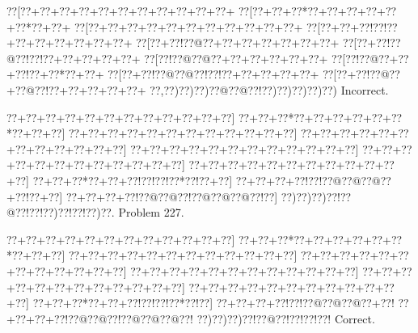 \documentclass[a5paper]{article}
\begin{document}
\begin{center}
{\goo
\0??[\0??+\0??+\0??+\0??+\0??+\0??+\0??+\0??+\0??+\0??+\0??+
\0??[\0??+\0??+\0??*\0??+\0??+\0??+\0??+\0??+\0??*\0??+\0??+
\0??[\0??+\0??+\0??+\0??+\0??+\0??+\0??+\0??+\0??+\0??+\0??+
\0??[\0??+\0??+\0??!\0??!\0??+\0??+\0??+\0??+\0??+\0??+\0??+
\0??[\0??+\0??!\0??@\0??+\0??+\0??+\0??+\0??+\0??+\0??+
\0??[\0??+\0??!\0??@\0??!\0??!\0??+\0??+\0??+\0??+\0??+
\0??[\0??!\0??@\0??@\0??+\0??+\0??+\0??+\0??+\0??+
\0??[\0??!\0??@\0??+\0??+\0??!\0??+\0??*\0??+\0??+
\0??[\0??+\0??!\0??@\0??@\0??!\0??!\0??+\0??+\0??+\0??+\0??+
\0??[\0??+\0??!\0??@\0??+\0??@\0??!\0??+\0??+\0??+\0??+\0??+
\0??,\0??)\0??)\0??)\0??@\0??@\0??!\0??)\0??)\0??)\0??)\0??)
}
Incorrect. 

\end{center}
\newpage
\begin{center}
{\goo
\0??+\0??+\0??+\0??+\0??+\0??+\0??+\0??+\0??+\0??+\0??+\0??]
\0??+\0??+\0??*\0??+\0??+\0??+\0??+\0??+\0??*\0??+\0??+\0??]
\0??+\0??+\0??+\0??+\0??+\0??+\0??+\0??+\0??+\0??+\0??+\0??]
\0??+\0??+\0??+\0??+\0??+\0??+\0??+\0??+\0??+\0??+\0??+\0??]
\0??+\0??+\0??+\0??+\0??+\0??+\0??+\0??+\0??+\0??+\0??+\0??]
\0??+\0??+\0??+\0??+\0??+\0??+\0??+\0??+\0??+\0??+\0??+\0??]
\0??+\0??+\0??+\0??+\0??+\0??+\0??+\0??+\0??+\0??+\0??+\0??]
\0??+\0??+\0??*\0??+\0??+\0??!\0??!\0??!\0??*\0??!\0??+\0??]
\0??+\0??+\0??+\0??!\0??!\0??@\0??@\0??@\0??+\0??!\0??+\0??]
\0??+\0??+\0??+\0??!\0??@\0??@\0??!\0??@\0??@\0??@\0??!\0??]
\0??)\0??)\0??)\0??!\0??@\0??!\0??!\0??)\0??!\0??!\0??)\0??.
}
Problem 227.

\end{center}
\begin{center}
{\goo
\0??+\0??+\0??+\0??+\0??+\0??+\0??+\0??+\0??+\0??+\0??+\0??]
\0??+\0??+\0??*\0??+\0??+\0??+\0??+\0??+\0??*\0??+\0??+\0??]
\0??+\0??+\0??+\0??+\0??+\0??+\0??+\0??+\0??+\0??+\0??+\0??]
\0??+\0??+\0??+\0??+\0??+\0??+\0??+\0??+\0??+\0??+\0??+\0??]
\0??+\0??+\0??+\0??+\0??+\0??+\0??+\0??+\0??+\0??+\0??+\0??]
\0??+\0??+\0??+\0??+\0??+\0??+\0??+\0??+\0??+\0??+\0??+\0??]
\0??+\0??+\0??+\0??+\0??+\0??+\0??+\0??+\0??+\0??+\0??+\0??]
\0??+\0??+\0??*\0??+\0??+\0??!\0??!\0??!\0??*\0??!\0??]
\0??+\0??+\0??+\0??!\0??!\0??@\0??@\0??@\0??+\0??!
\0??+\0??+\0??+\0??!\0??@\0??@\0??!\0??@\0??@\0??@\0??!
\0??)\0??)\0??)\0??!\0??@\0??!\0??!\0??!\0??!
}
Correct. 

\end{center}
\end{document}
